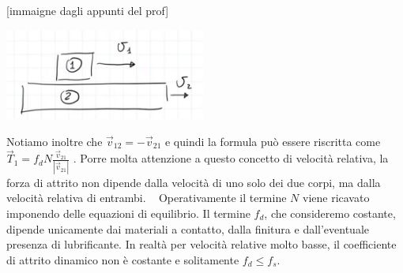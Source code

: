 [immaigne dagli appunti del prof]
\begin{center}
    \includegraphics[height=3cm]{../lezione11/img2.JPG}
\end{center}
Notiamo inoltre che $\vec{v}_{12} = - \vec{v}_{21}$ e quindi la formula può essere riscritta come $\vec{T}_1 = f_d N  \frac{\vec{v}_{21}}{|\vec{v}_{21}|}$ .\newline
Porre molta attenzione a questo concetto di velocità relativa, la forza di attrito non dipende dalla velocità di uno solo dei due corpi, ma dalla velocità relativa di entrambi.
\ \newline
Operativamente il termine $N$ viene ricavato imponendo delle equazioni di equilibrio. Il termine $f_d$, che consideremo costante, dipende unicamente dai materiali a contatto, dalla finitura e dall'eventuale presenza di lubrificante. In realtà per velocità relative molto basse, il coefficiente di attrito dinamico non è costante e solitamente $f_d \leq f_s$.\newline
\newline
